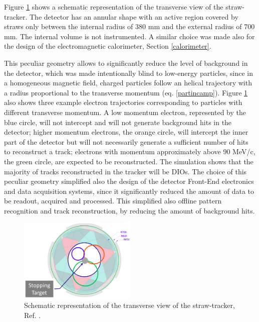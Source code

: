 Figure \ref{fig:sttrk} shows a schematic representation of the 
transverse view of the straw-tracker. 
The detector has an annular shape with an active region covered by straws only between the 
internal radius of 380 mm and the external radius of 700 mm. 
The internal volume is not instrumented. A similar choice 
was made also for the design of the electromagnetic calorimeter, Section \ref{calorimeter}. 

This peculiar geometry allows to significantly reduce the level of background in the detector, 
which was made intentionally blind to low-energy particles, since in a homogeneous magnetic field, 
charged particles follow an helical trajectory with a radius proportional to the transverse momentum
(eq. \ref{partincamp}).
Figure \ref{fig:sttrk} also shows three example electron trajectories corresponding 
to particles with different transverse momentum. A low momentum electron, 
represented by the blue circle, will not intercept and will not generate 
background hits in the detector; higher momentum electrons, the orange circle, 
will intercept the inner part of the detector but will not necessarily generate a 
sufficient number of hits to reconstruct a track; electrons with momentum approximately 
above 90 MeV/c, the green circle, are expected to be reconstructed. 
The simulation shows that the majority of tracks reconstructed in the tracker will be DIOs. 
The choice of this peculiar geometry simplified also the design of the detector 
Front-End electronics and data acquisition systems, since it significantly reduced the amount of 
data to be readout, acquired and processed. This simplified also offline pattern 
recognition and track reconstruction, by reducing the amount of background hits.

\begin{figure}[!h]
    \centering
    \includegraphics[width =0.5\textwidth]{figures/png/Screenshot_20240306_214911.png}
    \caption[The transverse view of the straw-tracker.]{Schematic 
    representation of the transverse view of the straw-tracker, Ref. \cite{trk}.}
    \label{fig:sttrk}
\end{figure}




